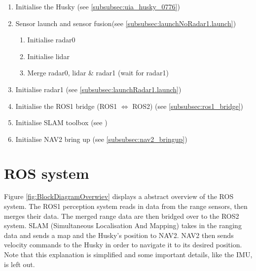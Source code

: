 \begin{enumerate}
    \item Initialise the Husky (see \ref{subsubsec:uia_husky_0776})
    \item Sensor launch and sensor fusion(see \ref{subsubsec:launchNoRadar1.launch})
    \begin{enumerate}[label=\alph*]
        \item Initialise radar0
        \item Initialise lidar
        \item Merge radar0, lidar \& radar1 (wait for radar1)
    \end{enumerate}
    \item Initialise radar1 (see \ref{subsubsec:launchRadar1.launch})
    \item Initialise the ROS1 bridge (ROS1 $\Leftrightarrow$ ROS2) (see \ref{subsubsec:ros1_bridge})
    \item Initialise SLAM toolbox (see \cite{slamToolbox})
    \item Initialise NAV2 bring up (see \ref{subsubsec:nav2_bringup})
\end{enumerate}
\section{ROS system}\label{sec:ROSsystem} %

Figure \ref{fig:BlockDiagramOverwiev} displays a abstract overview of the ROS system. The ROS1 perception system reads in data from the range sensors, then merges their data. The merged range data are then bridged over to the ROS2 system. SLAM (Simultaneous Localisation And Mapping) takes in the ranging data and sends a map and the Husky's position to NAV2. NAV2 then sends velocity commands to the Husky in order to navigate it to its desired position. Note that this explanation is simplified and some important details, like the IMU, is left out.

